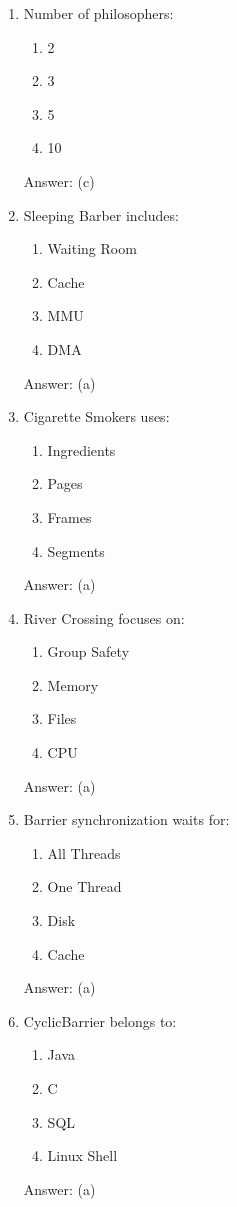 \begin{enumerate}
\item Number of philosophers:
\begin{enumerate}[label=(\alph*)]
\item 2
\item 3
\item 5
\item 10
\end{enumerate}
Answer: (c)

\item Sleeping Barber includes:
\begin{enumerate}[label=(\alph*)]
\item Waiting Room
\item Cache
\item MMU
\item DMA
\end{enumerate}
Answer: (a)

\item Cigarette Smokers uses:
\begin{enumerate}[label=(\alph*)]
\item Ingredients
\item Pages
\item Frames
\item Segments
\end{enumerate}
Answer: (a)

\item River Crossing focuses on:
\begin{enumerate}[label=(\alph*)]
\item Group Safety
\item Memory
\item Files
\item CPU
\end{enumerate}
Answer: (a)

\item Barrier synchronization waits for:
\begin{enumerate}[label=(\alph*)]
\item All Threads
\item One Thread
\item Disk
\item Cache
\end{enumerate}
Answer: (a)

\item CyclicBarrier belongs to:
\begin{enumerate}[label=(\alph*)]
\item Java
\item C
\item SQL
\item Linux Shell
\end{enumerate}
Answer: (a)


\end{enumerate}
